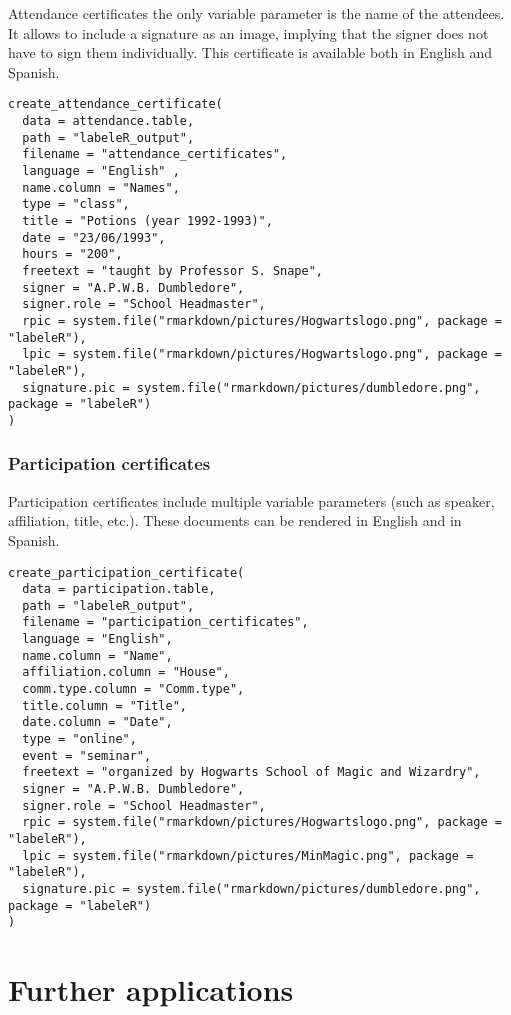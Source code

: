 \documentclass[draft,linenumbers]{agujournal2018}
\begin{document}
Attendance certificates the only variable parameter is the name of the
attendees. It allows to include a signature as an image, implying that
the signer does not have to sign them individually. This certificate is
available both in English and Spanish.

\begin{verbatim}
create_attendance_certificate(
  data = attendance.table,
  path = "labeleR_output",
  filename = "attendance_certificates",
  language = "English" ,
  name.column = "Names",
  type = "class",
  title = "Potions (year 1992-1993)",
  date = "23/06/1993",
  hours = "200",
  freetext = "taught by Professor S. Snape",
  signer = "A.P.W.B. Dumbledore",
  signer.role = "School Headmaster",
  rpic = system.file("rmarkdown/pictures/Hogwartslogo.png", package = "labeleR"),
  lpic = system.file("rmarkdown/pictures/Hogwartslogo.png", package = "labeleR"),
  signature.pic = system.file("rmarkdown/pictures/dumbledore.png", package = "labeleR")
)
\end{verbatim}

\subsubsection{Participation certificates}

Participation certificates include multiple variable parameters (such as
speaker, affiliation, title, etc.). These documents can be rendered in
English and in Spanish.

\begin{verbatim}
create_participation_certificate(
  data = participation.table,
  path = "labeleR_output",
  filename = "participation_certificates",
  language = "English",
  name.column = "Name",
  affiliation.column = "House",
  comm.type.column = "Comm.type",
  title.column = "Title",
  date.column = "Date",
  type = "online",
  event = "seminar",
  freetext = "organized by Hogwarts School of Magic and Wizardry",
  signer = "A.P.W.B. Dumbledore",
  signer.role = "School Headmaster",
  rpic = system.file("rmarkdown/pictures/Hogwartslogo.png", package = "labeleR"),
  lpic = system.file("rmarkdown/pictures/MinMagic.png", package = "labeleR"),
  signature.pic = system.file("rmarkdown/pictures/dumbledore.png", package = "labeleR")
)
\end{verbatim}

\section{Further applications}
\end{document}
